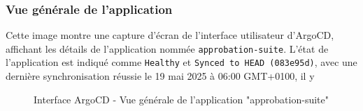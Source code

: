 \subsubsection{Vue générale de l’application}
Cette image montre une capture d’écran de l’interface utilisateur d’ArgoCD, affichant les détails de l’application nommée \texttt{approbation-suite}. L’état de l’application est indiqué comme \texttt{Healthy} et \texttt{Synced to HEAD (083e95d)}, avec une dernière synchronisation réussie le 19 mai 2025 à 06:00 GMT+0100, il y
\begin{figure}[h]
    \begin{adjustwidth}{-3.5cm}{-3.5cm}
    \centering
    \caption{Interface ArgoCD - Vue générale de l’application "approbation-suite"}
    \label{fig:argo1}
    \end{adjustwidth}
\end{figure}
